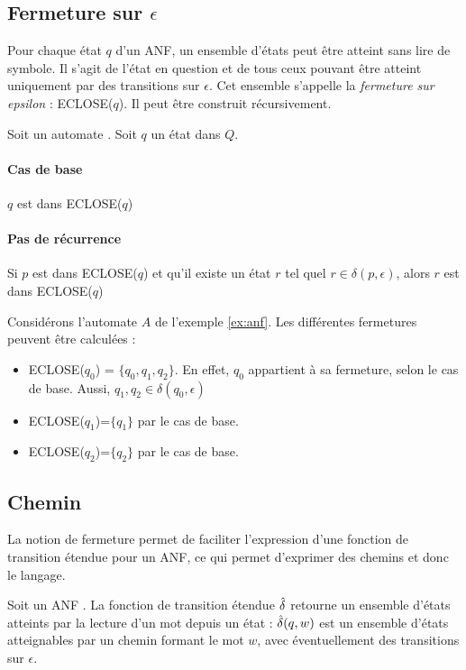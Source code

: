 \subsection{Fermeture sur $\epsilon$}

Pour chaque état $q$ d'un ANF, un ensemble d'états peut être atteint sans lire de symbole. Il s'agit de l'état en question et de tous ceux pouvant être atteint uniquement par des transitions sur $\epsilon$. Cet ensemble s'appelle la \emph{fermeture sur epsilon} : ECLOSE($q$). Il peut être construit récursivement.

Soit un automate \automaton. Soit $q$ un état dans $Q$.

\paragraph{Cas de base} $q$ est dans ECLOSE($q$)

\paragraph{Pas de récurrence} Si $p$ est dans ECLOSE($q$) et qu'il existe un état $r$ tel quel $r\in\delta(p,\epsilon)$, alors $r$ est dans ECLOSE($q$)

\begin{example}[ECLOSE]\label{ex:anfclosure} Considérons l'automate $A$ de l'exemple \ref{ex:anf}. Les différentes fermetures peuvent être calculées :
	\begin{itemize}
		\item ECLOSE($q_0$) = $\{q_0,q_1,q_2\}$. En effet, $q_0$ appartient à sa fermeture, selon le cas de base. Aussi, $q_1,q_2\in\delta(q_0, \epsilon)$
		\item ECLOSE($q_1$)=$\{q_1\}$ par le cas de base.
		\item ECLOSE($q_2$)=$\{q_2\}$ par le cas de base.
	\end{itemize}
\end{example}


\subsection{Chemin}

La notion de fermeture permet de faciliter l'expression d'une fonction de transition étendue pour un ANF, ce qui permet d'exprimer des chemins et donc le langage.

Soit un ANF \automaton. La fonction de transition étendue $\hat{\delta}$ retourne un ensemble d'états atteints par la lecture d'un mot depuis un état : $\hat{\delta}(q,w)$ est un ensemble d'états atteignables par un chemin formant le mot $w$, avec éventuellement des transitions sur $\epsilon$.


